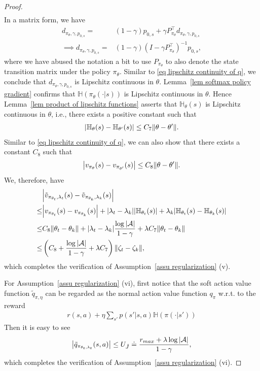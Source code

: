 \documentclass[twoside,11pt]{article}
\newcommand{\fA}{\mathcal{A}}
\newcommand{\na}{{|\fA|}}
\newcommand{\ent}[1]{\mathbb{H}\left(#1\right)}
\numberwithin{assucounter}{section}
\begin{document}
\begin{proof}
\begin{align}
  \end{align}
  In a matrix form,
  we have
  \begin{align}
    d_{\pi_\theta, \gamma, p_{0, s}} =& (1 - \gamma) p_{0, s} + \gamma P_{\pi_\theta}^\top d_{\pi_\theta, \gamma, p_{0, s}} \\
    \implies d_{\pi_\theta, \gamma, p_{0, s}} =& (1 - \gamma) (I - \gamma P_{\pi_\theta}^\top)^{-1} p_{0, s},
  \end{align}
  where we have abused the notation a bit to use $P_{\pi_\theta}$ to also denote the state transition matrix under the policy $\pi_\theta$.
  Similar to \eqref{eq lipschitz continuity of q},
  we conclude that $d_{\pi_\theta, \gamma, p_{0, s}}$ is Lipschitz continuous in $\theta$.
  Lemma~\ref{lem softmax policy gradient} confirms that 
  $\ent{\pi_\theta(\cdot |s)}$ is Lipschitz continuous in $\theta$.
  Hence Lemma~\ref{lem product of lipschitz functions} asserts that $\mathbb{H}_{\theta}(s)$ is Lipschitz continuous in $\theta$, 
  i.e.,
  there exists a positive constant such that
  \begin{align}
    \label{eq tmp 9}
    \abs{\mathbb{H}_\theta(s) - \mathbb{H}_{\theta'}(s)} \leq C_7 \norm{\theta - \theta'}.
  \end{align}
  Similar to \eqref{eq lipschitz continuity of q},
  we can also show that there exists a constant $C_8$ such that
  \begin{align}
    \label{eq tmp 10}
    \abs{v_{\pi_\theta}(s) - v_{\pi_{\theta'}}(s)} \leq C_8 \norm{\theta - \theta'}.
  \end{align}
  We, therefore, have
  \begin{align}
    &\abs{{\tilde v_{\pi_{\theta_t}, \lambda_t}(s) - \tilde v_{\pi_{\theta_k}, \lambda_k}}(s)} \\
    \leq& \abs{v_{\pi_{\theta_t}}(s) - v_{\pi_{\theta_k}}(s)} + \abs{\lambda_t - \lambda_k} \abs{\mathbb{H}_{\theta_t}(s)} + \lambda_k \abs{\mathbb{H}_{\theta_t}(s) - \mathbb{H}_{\theta_k}(s)} \\
    \leq& C_8 \norm{\theta_t - \theta_k} + \abs{\lambda_t - \lambda_k} \frac{\log \na}{1 - \gamma} + \lambda C_7 \norm{\theta_t - \theta_k} \\
    \leq& \left(C_8 + \frac{\log \na}{1 - \gamma} + \lambda C_7\right) \norm{\zeta_t - \zeta_k},
  \end{align}
  which completes the verification of Assumption~\ref{assu regularization} (v).

  For Assumption~\ref{assu regularization} (vi),
  first notice that
  the soft action value function $\tilde q_{\pi, \eta}$ can be regarded as the normal action value function $q_\pi$ w.r.t. to the reward
  \begin{align}
    r(s, a) + \eta \sum_{s'}p(s'|s,a) \ent{\pi(\cdot|s')}
  \end{align}
  Then it is easy to see 
  \begin{align}
    \label{eq soft q bound}
    \abs{\tilde q_{\pi_{\theta_t, \lambda_t}}(s, a)} \leq U_{\tilde J} \doteq \frac{r_{max} + \lambda \log \na}{1 - \gamma},
  \end{align}
  which completes the verification of Assumption~\ref{assu regularization} (vi).


\end{proof}
\end{document}
